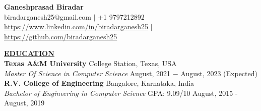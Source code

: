\documentclass{article}
\begin{document}
\begin{center}
\thispagestyle{empty}
\large \textbf{Ganeshprasad Biradar \\}
\normalsize biradarganesh25@gmail.com $\mid$ +1 9797212892 \\ \url{https://www.linkedin.com/in/biradarganesh25} $\mid$ \url{https://github.com/biradarganesh25} \\
\hrulefill
\end{center}





\noindent \textbf{\underline{EDUCATION}} \\
\textbf{Texas A\&M University} \hfill College Station, Texas, USA \\
\textit{Master Of Science in Computer Science}  \hfill August, 2021 $-$ August, 2023 (Expected) \\

\noindent \textbf{R.V. College of Engineering} \hfill Bangalore, Karnataka, India \\
\textit{Bachelor of Engineering in Computer Science} \hspace{1.1cm} GPA: 9.09/10 \hfill August, 2015 - August, 2019 \\
\\
\end{document}
